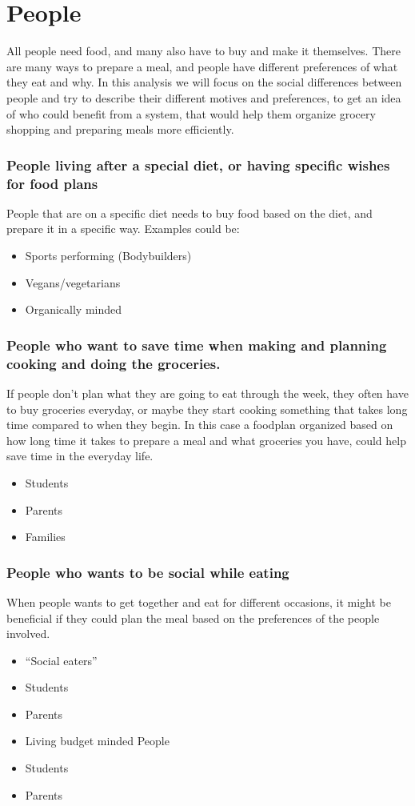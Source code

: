 \section{People}
All people need food, and many also have to buy and make it themselves. There are many ways to prepare a meal, and people have different preferences of what they eat and why. In this analysis we will focus on the social differences between people and try to describe their different motives and preferences, to get an idea of who could benefit from a system, that would help them organize grocery shopping and preparing meals more efficiently.

\subsubsection{People living after a special diet, or having specific wishes for food plans}
People that are on a specific diet needs to buy food based on the diet, and prepare it in a specific way.
Examples could be:
\begin{itemize}
\item Sports performing (Bodybuilders)
\item Vegans/vegetarians
\item Organically minded
\end{itemize}

\subsubsection{People who want to save time when making and planning cooking and doing the groceries.} 
If people don't plan what they are going to eat through the week, they often have to buy groceries everyday, or maybe they start cooking something that takes long time compared to when they begin. In this case a foodplan organized based on how long time it takes to prepare a meal and what groceries you have, could help save time in the everyday life.
\begin{itemize}
\item Students
\item Parents
\item Families
\end{itemize}

\subsubsection{People who wants to be social while eating}
When people wants to get together and eat for different occasions, it might be beneficial if they could plan the meal based on the preferences of the people involved.
\begin{itemize}
\item “Social eaters”
\item Students
\item Parents
\item Living budget minded People
\item Students
\item Parents
\end{itemize}

